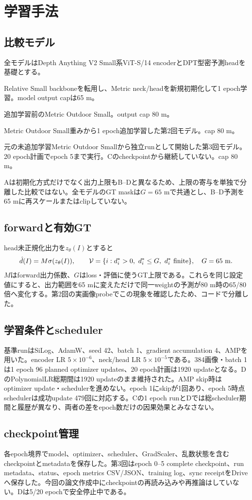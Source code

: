 \chapter{学習手法}
\section{比較モデル}
全モデルはDepth Anything V2 Small系ViT-S/14 encoderとDPT型密予測headを基礎とする\cite{dav2,dpt2021}。
\begin{description}[leftmargin=2.6em,style=nextline]
\item[モデルA] Relative Small backboneを転用し、Metric neck/headを新規初期化して1 epoch学習。model output capは65 m。
\item[モデルB] 追加学習前のMetric Outdoor Small。output cap 80 m。
\item[モデルC] Metric Outdoor Small重みから1 epoch追加学習した第2回モデル。cap 80 m。
\item[モデルD] 元の未追加学習Metric Outdoor Smallから独立runとして開始した第3回モデル。20 epoch計画でepoch 5まで実行。Cのcheckpointから継続していない。cap 80 m。
\end{description}
Aは初期化方式だけでなく出力上限もB--Dと異なるため、上限の寄与を単独で分離した比較ではない。全モデルのGT maskは$G=65$ mで共通とし、B--D予測を65 mに再スケールまたはclipしていない。
\section{forwardと有効GT}
head未正規化出力を$z_\theta(I)$とすると
\[
\hat d(I)=M\sigma(z_\theta(I)),\qquad
\mathcal{V}=\{i:d_i^*>0,\ d_i^*\le G,\ d_i^*\text{ finite}\},\quad G=65\ {\rm m}.
\]
$M$はforward出力係数、$G$はloss・評価に使うGT上限である。これらを同じ設定値にすると、出力範囲を65 mに変えただけで同一weightの予測が80 m時の65/80倍へ変化する。第2回の実画像probeでこの現象を確認したため、コードで分離した。
\section{学習条件とscheduler}
基準runはSiLog、AdamW\cite{adamw}、seed 42、batch 1、gradient accumulation 4、AMPを用いた。encoder LR $5\times10^{-6}$、neck/head LR $5\times10^{-5}$である。384画像・batch 1は1 epoch 96 planned optimizer updates、20 epoch計画は1920 updateとなる。DのPolynomialLR総期間は1920 updateのまま維持された。AMP skip時はoptimizer update・schedulerを進めない。epoch 1にskipが1回あり、epoch 5時点schedulerは成功update 479回に対応する。Cの1 epoch runとDでは総scheduler期間と履歴が異なり、両者の差をepoch数だけの因果効果とみなさない。
\section{checkpoint管理}
各epoch境界でmodel、optimizer、scheduler、GradScaler、乱数状態を含むcheckpointとmetadataを保存した。第3回はepoch 0--5 complete checkpoint、run metadata、status、epoch metrics CSV/JSON、training log、sync receiptをDriveへ保存した。今回の論文作成中にcheckpointの再読み込みや再推論はしていない。Dは5/20 epochで安全停止中である。